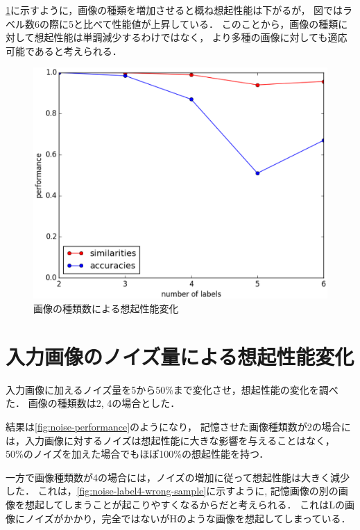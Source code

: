 \documentclass[10pt,twocolumn]{jarticle}
\newcommand{\figref}[1]{\figurename\ref{fig:#1}}
\begin{document}
\figref{labels-performance}に示すように，画像の種類を増加させると概ね想起性能は下がるが，
図ではラベル数6の際に5と比べて性能値が上昇している．
このことから，画像の種類に対して想起性能は単調減少するわけではなく，
より多種の画像に対しても適応可能であると考えられる．
\begin{figure}[hbtp]
  \centering
    \includegraphics[width=\columnwidth]{figs/labels_performance}
    \caption{画像の種類数による想起性能変化}
    \label{fig:labels-performance}
\end{figure}


\section{入力画像のノイズ量による想起性能変化}
入力画像に加えるノイズ量を5から50\%まで変化させ，想起性能の変化を調べた．
画像の種類数は2, 4の場合とした．

結果は\figref{noise-performance}のようになり，
記憶させた画像種類数が2の場合には，入力画像に対するノイズは想起性能に大きな影響を与えることはなく，
50\%のノイズを加えた場合でもほぼ100\%の想起性能を持つ．

一方で画像種類数が4の場合には，ノイズの増加に従って想起性能は大きく減少した．
これは，\figref{noise-label4-wrong-sample}に示すように,
記憶画像の別の画像を想起してしまうことが起こりやすくなるからだと考えられる．
これはLの画像にノイズがかかり，完全ではないがHのような画像を想起してしまっている．
\end{document}
